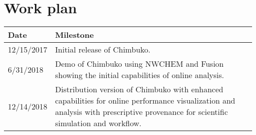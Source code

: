 \section{Work plan}

\begin{tabular}{|p{0.7in}|p{5.5in}|}\hline
\textbf{Date}  & \textbf{Milestone} \\\hline
12/15/2017 & Initial release of Chimbuko. \\\hline
6/31/2018 &  Demo of Chimbuko using NWCHEM and Fusion showing the initial capabilities of online analysis.\\\hline
12/14/2018 & Distribution version of Chimbuko with enhanced capabilities for online performance visualization and analysis with prescriptive provenance for scientific simulation and workflow. \\\hline

\end{tabular}
